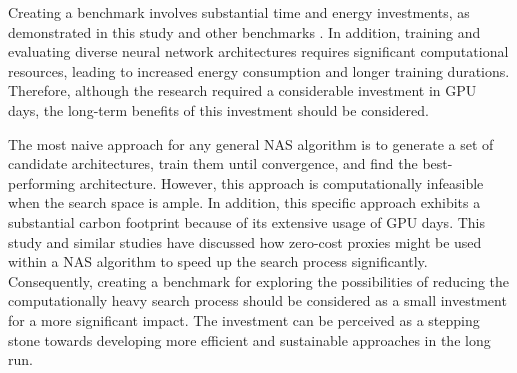 Creating a benchmark involves substantial time and energy investments, as demonstrated in this study and other benchmarks \autocite{dong2020bench, ying2019bench, tu2021bench}. In addition, training and evaluating diverse neural network architectures requires significant computational resources, leading to increased energy consumption and longer training durations. Therefore, although the research required a considerable investment in GPU days, the long-term benefits of this investment should be considered. 

The most naive approach for any general NAS algorithm is to generate a set of candidate architectures, train them until convergence, and find the best-performing architecture. However, this approach is computationally infeasible when the search space is ample. In addition, this specific approach exhibits a substantial carbon footprint because of its extensive usage of GPU days. This study and similar studies \autocite{abdelfattah2021zero, colin2022adeeperlook} have discussed how zero-cost proxies might be used within a NAS algorithm to speed up the search process significantly. Consequently, creating a benchmark for exploring the possibilities of reducing the computationally heavy search process should be considered as a small investment for a more significant impact. The investment can be perceived as a stepping stone towards developing more efficient and sustainable approaches in the long run.

\begin{comment}
    
\subsection{Balancing Performance and Environmental Impact}
\begin{itemize}
    \item Acknowledge the trade-offs between performance, energy consumption, and carbon emissions
    \item Discuss the importance of considering environmental implications when developing new algorithms and techniques
\end{itemize}
\end{comment}